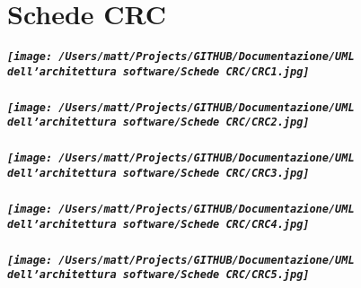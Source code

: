 \chapter{Schede CRC}

\paragraph{
    \texttt{[image: /Users/matt/Projects/GITHUB/Documentazione/UML dell'architettura software/Schede CRC/CRC1.jpg]}
}

\paragraph{
    \texttt{[image: /Users/matt/Projects/GITHUB/Documentazione/UML dell'architettura software/Schede CRC/CRC2.jpg]}
}

\paragraph{
    \texttt{[image: /Users/matt/Projects/GITHUB/Documentazione/UML dell'architettura software/Schede CRC/CRC3.jpg]}
}

\paragraph{
    \texttt{[image: /Users/matt/Projects/GITHUB/Documentazione/UML dell'architettura software/Schede CRC/CRC4.jpg]}
}

\paragraph{
    \texttt{[image: /Users/matt/Projects/GITHUB/Documentazione/UML dell'architettura software/Schede CRC/CRC5.jpg]}
}